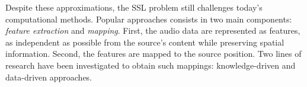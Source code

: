 \mynewline
Despite
 these approximations, the \ac{SSL} problem still challenges today's computational methods.
Popular approaches consists in two main components: \textit{feature extraction} and \textit{mapping}.
First, the audio data are represented as features, as independent as possible from the source's content while preserving spatial information.
Second, the features are mapped to the source position.
Two lines of research have been investigated to obtain such mappings: knowledge-driven and data-driven approaches.

